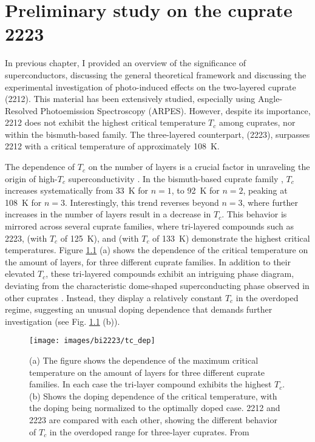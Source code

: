 \chapter{Preliminary study on the cuprate 2223}

In previous chapter, I provided an overview of the significance of superconductors, discussing the general theoretical framework and discussing the experimental investigation of photo-induced effects on the two-layered cuprate  (2212).
This material has been extensively studied, especially using Angle-Resolved Photoemission Spectroscopy (ARPES).
However, despite its importance, 2212 does not exhibit the highest critical temperature $T_c$ among cuprates, nor within the bismuth-based family.
The three-layered counterpart,  (2223), surpasses 2212 with a critical temperature of approximately \qty{108}{\kelvin}.

The dependence of $T_c$ on the number of  layers is a crucial factor in unraveling the origin of high-$T_c$ superconductivity \cite{feng_electronic_2002, scott_layer_1994, chakravarty_explanation_2004,iyo_tc_2007,chu_hole-doped_2015,luo_electronic_2023}.
In the bismuth-based cuprate family , $T_c$ increases systematically from \qty{33}{\kelvin} for $n=1$, to \qty{92}{\kelvin} for $n=2$, peaking at \qty{108}{\kelvin} for $n=3$.
Interestingly, this trend reverses beyond $n=3$, where further increases in the number of  layers result in a decrease in $T_c$.
This behavior is mirrored across several cuprate families, where tri-layered compounds such as 2223,  (with $T_c$ of \qty{125}{\kelvin}), and  (with $T_c$ of \qty{133}{\kelvin}) demonstrate the highest critical temperatures.
Figure \ref{fig:tcdep} (a) shows the dependence of the critical temperature on the amount of  layers, for three different cuprate families.
In addition to their elevated $T_c$, these tri-layered compounds exhibit an intriguing phase diagram, deviating from the characteristic dome-shaped superconducting phase observed in other cuprates \cite{fujii_doping_2002,piriou_effect_2008}.
Instead, they display a relatively constant $T_c$ in the overdoped regime, suggesting an unusual doping dependence that demands further investigation (see Fig. \ref{fig:tcdep} (b)).

\begin{figure}
	\centering
	\texttt{[image: images/bi2223/tc\_dep]}
	\caption{(a) The figure shows the dependence of the maximum critical temperature on the amount of  layers for three different cuprate families. In each case the tri-layer compound exhibits the highest $T_c$. (b) Shows the doping dependence of the critical temperature, with the doping being normalized to the optimally doped case. 2212 and 2223 are compared with each other, showing the different behavior of $T_c$ in the overdoped range for three-layer cuprates. From \cite{luo_electronic_2023}}
	\label{fig:tcdep}
\end{figure}


